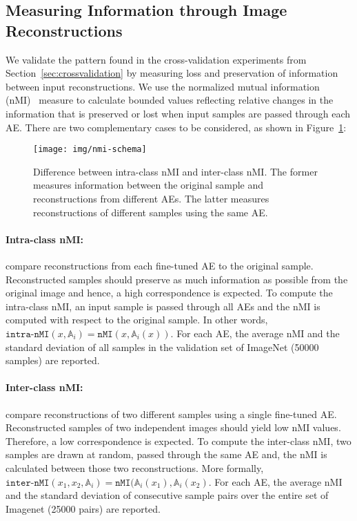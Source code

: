 \documentclass[10pt,twocolumn,a4paper]{article}
\newcommand{\autoe}[1]{\mathbb{A}_{#1}}
\begin{document}
\subsection{Measuring Information through Image Reconstructions}

We validate the pattern found in the cross-validation experiments from Section~\ref{sec:crossvalidation} by measuring loss and preservation of information between input reconstructions.
We use the normalized mutual information (nMI)~\cite{strehl2002cluster} measure to calculate bounded values reflecting relative changes in the information that is preserved or lost when input samples are passed through each AE.
There are two complementary cases to be considered, as shown in Figure~\ref{fig:nmi-idea}:

\begin{figure}
	\centering
	\texttt{[image: img/nmi-schema]}
	\caption{Difference between intra-class nMI and inter-class nMI. The former measures information between the original sample and reconstructions from different AEs. The latter measures reconstructions of different samples using the same AE.}
	\label{fig:nmi-idea}
\end{figure}\vspace{-1.5em}\paragraph{Intra-class nMI:} compare reconstructions from each fine-tuned AE to the original sample.
Reconstructed samples should preserve as much information as possible from the original image and hence, a high correspondence is expected.
To compute the intra-class nMI, an input sample is passed through all AEs and the nMI is computed with respect to the original sample.
In other words, $\texttt{intra-nMI}(x, \autoe{i}) = \texttt{nMI}(x, \autoe{i}(x))$.
For each AE, the average nMI and the standard deviation of all samples in the validation set of ImageNet (50000 samples) are reported.

\vspace{-1.5em}\paragraph{Inter-class nMI:} compare reconstructions of two different samples using a single fine-tuned AE.
Reconstructed samples of two independent images should yield low nMI values.
Therefore, a low correspondence is expected.
To compute the inter-class nMI, two samples are drawn at random, passed through the same AE and, the nMI is calculated between those two reconstructions.
More formally, $\texttt{inter-nMI}(x_1, x_2, \autoe{i}) = \texttt{nMI}(\autoe{i}(x_1), \autoe{i}(x_2)$.
For each AE, the average nMI and the standard deviation of consecutive sample pairs over the entire set of Imagenet (25000 pairs) are reported.
\end{document}
